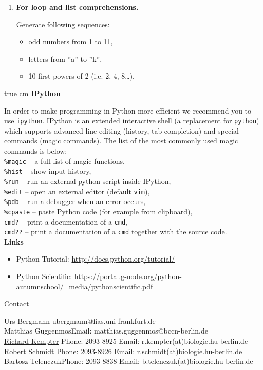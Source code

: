 \documentclass[12pt, a4]{article}
\begin{document}
\begin{enumerate}
\item \textbf{For loop and list comprehensions.} 

        Generate following sequences:

        \begin{itemize}
            \item odd numbers from 1 to 11,
            \item letters from ''a'' to ''k'',
            \item 10 first powers of 2 (i.e. 2, 4,
                8\dots),
        \end{itemize}


\end{enumerate}

 true cm
{\bf IPython}

\medskip
In order to make programming in Python more efficient we recommend you
to use \texttt{ipython}. IPython is an extended interactive shell (a
replacement for \texttt{python}) which supports advanced line editing
(history, tab completion) and special commands (magic commands). The
list of the most commonly used magic commands is below: \\

\texttt{\%magic} -- a full list of magic functions, \\
\texttt{\%hist} -- show input history, \\
\texttt{\%run} -- run an external python script inside IPython, \\
\texttt{\%edit} -- open an external editor (default \texttt{vim}), \\
\texttt{\%pdb} -- run a debugger when an error occurs, \\
\texttt{\%cpaste} -- paste Python code (for example from clipboard),\\
\texttt{cmd?} -- print a documentation of a \texttt{cmd}, \\
\texttt{cmd??} -- print a documentation of a \texttt{cmd} together
with the source code.\\

\medskip
{\bf Links}
\begin{itemize}
    \item Python Tutorial: \url{http://docs.python.org/tutorial/}
    \item Python Scientific: 
        \url{https://portal.g-node.org/python-autumnschool/_media/pythonscientific.pdf}
\end{itemize}


\vfill
\centerline{\CAP Contact}
\CAP

Urs Bergmann \hfill ubergmann@fias.uni-frankfurt.de \\ 
Matthias Guggenmos\hfill Email: matthias.guggenmos@bccn-berlin.de\\
\underline{Richard Kempter} \hfill Phone: 2093-8925 \hfill
Email: r.kempter(at)biologie.hu-berlin.de \\
Robert Schmidt \hfill Phone: 2093-8926 \hfill
Email: r.schmidt(at)biologie.hu-berlin.de \\
Bartosz Telenczuk\hfill Phone: 2093-8838 \hfill
Email: b.telenczuk(at)biologie.hu-berlin.de \\
\end{document}

